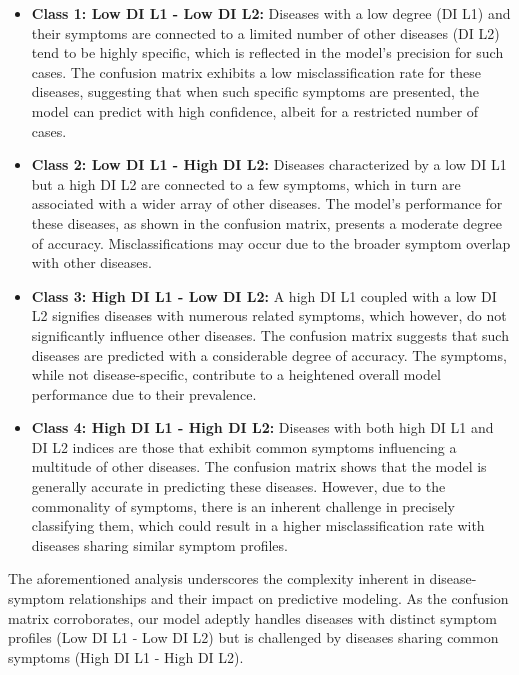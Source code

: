 \begin{itemize}
	\item \textbf{Class 1: Low DI L1 - Low DI L2:} Diseases with a low degree (DI L1) and their symptoms are connected to a limited number
	      of other diseases (DI L2) tend to be highly specific, which is reflected in the model's precision for such cases.
	      The confusion matrix exhibits a low misclassification rate for these diseases,
	      suggesting that when such specific symptoms are presented, the model can predict with high confidence,
	      albeit for a restricted number of cases.

	\item \textbf{Class 2: Low DI L1 - High DI L2:} Diseases characterized by a low DI L1 but a high DI L2 are connected to a few symptoms,
	      which in turn are associated with a wider array of other diseases. The model's performance for these diseases,
	      as shown in the confusion matrix, presents a moderate degree of accuracy.
	      Misclassifications may occur due to the broader symptom overlap with other diseases.

	\item \textbf{Class 3: High DI L1 - Low DI L2:} A high DI L1 coupled with a low DI L2 signifies diseases with numerous related symptoms,
	      which however, do not significantly influence other diseases.
	      The confusion matrix suggests that such diseases are predicted with a considerable degree of accuracy.
	      The symptoms, while not disease-specific, contribute to a heightened overall model performance due to their prevalence.

	\item \textbf{Class 4: High DI L1 - High DI L2:} Diseases with both high DI L1 and DI L2 indices are those that exhibit common symptoms
	      influencing a multitude of other diseases. The confusion matrix shows that the model is generally accurate in predicting these diseases.
	      However, due to the commonality of symptoms, there is an inherent challenge in precisely classifying them,
	      which could result in a higher misclassification rate with diseases sharing similar symptom profiles.
\end{itemize}
\noindent
The aforementioned analysis underscores the complexity inherent in disease-symptom relationships and their impact on predictive modeling.
As the confusion matrix corroborates, our model adeptly handles diseases with distinct symptom profiles (Low DI L1 - Low DI L2)
but is challenged by diseases sharing common symptoms (High DI L1 - High DI L2).
